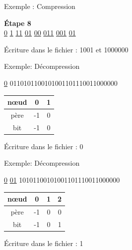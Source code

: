 \documentclass[french]{beamer}
\begin{document}
\begin{frame}{Exemple : Compression}
	\begin{center}
	\textbf{Étape 8} \\
	\underline{0} \underline{1} \underline{11} \underline{01} \underline{00} \underline{011} \underline{001} \underline{01} \\
	\end{center}
	\begin{flushleft}
	Écriture dans le fichier : 1001 et 1000000
	\end{flushleft}
\end{frame}


\begin{frame}{Exemple: Décompression}

\begin{center}
\underline{0} 0110101100101001101110011000000
\end{center}

\begin{center}
	\begin{tabular}{|c|c|c|}
	\hline
	nœud & 0 & 1 \\
	\hline
	père & -1 & 0 \\
	\hline
	bit & -1 & 0 \\
	\hline 
	\end{tabular}
	\begin{center}
	Écriture dans le fichier : 0
	\end{center}
	\end{center}
\end{frame}

\begin{frame}{Exemple: Décompression}
\begin{center}
\underline{0} \underline{01} 10101100101001101110011000000
\end{center}

	\begin{center}
	\begin{tabular}{|c|c|c|c|}
	\hline
	nœud & 0 & 1 & 2 \\
	\hline
	père & -1 & 0 & 0 \\
	\hline
	bit & -1 & 0 & 1 \\
	\hline 
	\end{tabular}
 \begin{center}
	Écriture dans le fichier : 1
	\end{center}

	\end{center}
\end{frame}
\end{document}
